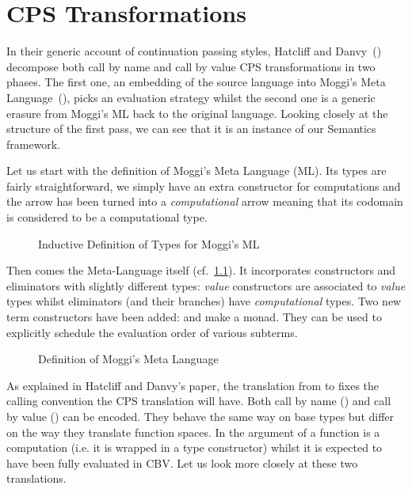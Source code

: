 \chapter{CPS Transformations}
\label{cps-transformation}

In their generic account of continuation passing styles, Hatcliff and
Danvy~(\citeyear{hatcliff1994generic}) decompose both call by name and
call by value CPS transformations in two phases. The first one, an
embedding of the source language into Moggi's Meta Language~(\citeyear{moggi1991notions}),
picks an evaluation strategy whilst the second one is a generic erasure
from Moggi's ML back to the original language. Looking closely at the
structure of the first pass, we can see that it is an instance of our
Semantics framework.

Let us start with the definition of Moggi's Meta Language (ML). Its types
are fairly straightforward, we simply have an extra constructor \AIC{\#\_}
for computations and the arrow has been turned into a \emph{computational}
arrow meaning that its codomain is considered to be a computational type.

\begin{figure}[h]
\caption{Inductive Definition of Types for Moggi's ML}
\end{figure}

Then comes the Meta-Language itself (cf.~\cref{fig:moggiml}). It incorporates
 constructors and eliminators with slightly different types: \emph{value}
constructors are associated to \emph{value} types whilst eliminators (and their
branches) have \emph{computational} types. Two new term constructors have been
added:  and  make \AIC{\#\_} a monad. They can be used to
explicitly schedule the evaluation order of various subterms.

\begin{figure}[h]
\caption{Definition of Moggi's Meta Language\label{fig:moggiml}}
\end{figure}

As explained in Hatcliff and Danvy's paper, the translation from  to
 fixes the calling convention the CPS translation will have. Both call
by name () and call by value () can be encoded. They behave the
same way on base types but differ on the way they translate function spaces.
In  the argument of a function is a computation (i.e. it is wrapped in
a \AIC{\#\_} type constructor) whilst it is expected to have been fully evaluated
in CBV. Let us look more closely at these two translations.

